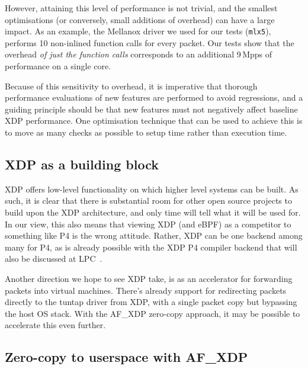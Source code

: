 \documentclass[sigconf]{acmart}
\begin{document}
However, attaining this level of performance is not trivial, and the smallest
optimisations (or conversely, small additions of overhead) can have a large
impact. As an example, the Mellanox driver we used for our tests
(\texttt{mlx5}), performs 10 non-inlined function calls for every packet. Our
tests show that the overhead \emph{of just the function calls} corresponds to an
additional 9\,Mpps of performance on a single core.


Because of this sensitivity to overhead, it is imperative that thorough
performance evaluations of new features are performed to avoid regressions, and
a guiding principle should be that new features must not negatively affect
baseline XDP performance. One optimisation technique that can be used to achieve
this is to move as many checks as possible to setup time rather than execution
time.

\subsection{XDP as a building block}
\label{sec:xdp-as-building}

XDP offers low-level functionality on which higher level systems can be built.
As such, it is clear that there is substantial room for other open source
projects to build upon the XDP architecture, and only time will tell what it
will be used for. In our view, this also means that viewing XDP (and eBPF) as a
competitor to something like P4 is the wrong attitude. Rather, XDP can be one
backend among many for P4, as is already possible with the XDP P4 compiler
backend that will also be discussed at LPC~\cite{xdp-p4}.

Another direction we hope to see XDP take, is as an accelerator for forwarding
packets into virtual machines. There's already support for redirecting packets
directly to the tuntap driver from XDP, with a single packet copy but bypassing
the host OS stack. With the AF\_XDP zero-copy approach, it may be possible to
accelerate this even further.

\subsection{Zero-copy to userspace with AF\_XDP}
\label{sec:zero-copy-userspace}
\end{document}
